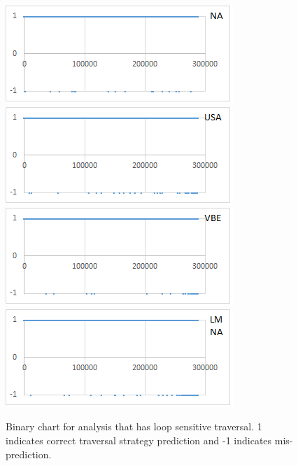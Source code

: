 \begin{figure}[ht!]
\includegraphics[width=0.32\linewidth]{tex-figures/loops/nullness.png}
\includegraphics[width=0.32\linewidth]{tex-figures/loops/usa.png}
\includegraphics[width=0.32\linewidth]{tex-figures/loops/vbe.png}
\includegraphics[width=0.32\linewidth]{tex-figures/loops/lmna.png}
\caption[Binary chart for analysis that has loop sensitive traversal. 1 indicates correct traversal strategy prediction and -1 indicates mis-prediction.]{Binary chart for analysis that has loop sensitive traversal. 1 indicates correct traversal strategy prediction and -1 indicates mis-prediction.}
\label{fig:loops}
\end{figure}
